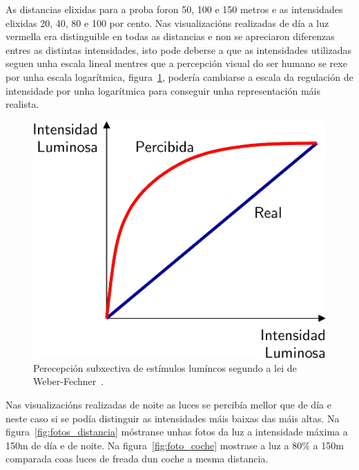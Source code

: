 As distancias elixidas para a proba foron 50, 100 e 150 metros e as intensidades elixidas 20, 40, 80 e 100 por cento.
Nas visualizacións realizadas de día a luz vermella era distinguible en todas as distancias e non se apreciaron diferenzas entres as distintas intensidades, isto pode deberse a que as intensidades utilizadas seguen unha escala lineal mentres que a percepción visual do ser humano se rexe por unha escala logarítmica, figura~\ref{fig:percepcion_luminica}, podería cambiarse a escala da regulación de intensidade por unha logarítmica para conseguir unha representación máis realista.
\begin{figure}[tbp]
  \centering
  \includegraphics[scale=0.2]{imaxes/percepcion-luminica.png}
  \caption{Perecepción subxectiva de estímulos lumíncos segundo a lei de Weber-Fechner~\cite{PercepionVisual}.}
  \label{fig:percepcion_luminica}
\end{figure}

Nas visualizacións realizadas de noite as luces se percibía mellor que de día e neste caso si se podía distinguir as intensidades máis baixas das máis altas. Na figura~\ref{fig:fotos_distancia} móstranse unhas fotos da luz a intensidade máxima a 150m de día e de noite. Na figura~\ref{fig:foto_coche} mostrase a luz a 80\(\%\) a 150m comparada coas luces de freada dun coche a mesma distancia.

